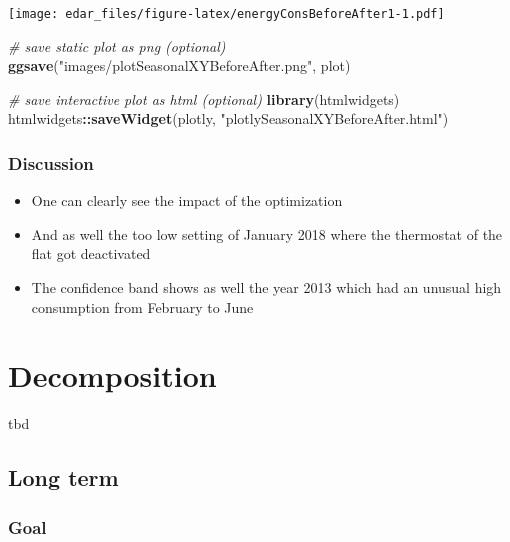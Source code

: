 \documentclass[
]{book}
\newenvironment{Shaded}{\begin{snugshade}}{\end{snugshade}}
\newcommand{\CommentTok}[1]{\textcolor[rgb]{0.56,0.35,0.01}{\textit{#1}}}
\newcommand{\KeywordTok}[1]{\textcolor[rgb]{0.13,0.29,0.53}{\textbf{#1}}}
\newcommand{\NormalTok}[1]{#1}
\newcommand{\OperatorTok}[1]{\textcolor[rgb]{0.81,0.36,0.00}{\textbf{#1}}}
\newcommand{\StringTok}[1]{\textcolor[rgb]{0.31,0.60,0.02}{#1}}
\let\oldShaded\Shaded
\let\endoldShaded\endShaded
\renewenvironment{Shaded}{\footnotesize\oldShaded}{\endoldShaded}
\begin{document}
\texttt{[image: edar\_files/figure-latex/energyConsBeforeAfter1-1.pdf]}

\begin{Shaded}
\begin{Highlighting}[]
\CommentTok{# save static plot as png (optional)}
\KeywordTok{ggsave}\NormalTok{(}\StringTok{"images/plotSeasonalXYBeforeAfter.png"}\NormalTok{, plot)}
\end{Highlighting}
\end{Shaded}

\begin{Shaded}
\begin{Highlighting}[]
\CommentTok{# save interactive plot as html (optional)}
\KeywordTok{library}\NormalTok{(htmlwidgets)}
\NormalTok{htmlwidgets}\OperatorTok{::}\KeywordTok{saveWidget}\NormalTok{(plotly, }\StringTok{"plotlySeasonalXYBeforeAfter.html"}\NormalTok{)}
\end{Highlighting}
\end{Shaded}

\hypertarget{discussion-3}{%
\subsection{Discussion}\label{discussion-3}}

\begin{itemize}
\item
  One can clearly see the impact of the optimization
\item
  And as well the too low setting of January 2018 where the thermostat of the flat got deactivated
\item
  The confidence band shows as well the year 2013 which had an unusual high consumption from February to June
\end{itemize}

\hypertarget{decomposition}{%
\chapter{Decomposition}\label{decomposition}}

tbd

\hypertarget{long-term}{%
\section{Long term}\label{long-term}}

\hypertarget{goal-4}{%
\subsection{Goal}\label{goal-4}}
\end{document}
